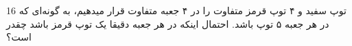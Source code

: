 16 توپ سفید و ۴ توپ قرمز متفاوت را در ۴ جعبه متفاوت قرار میدهیم، به گونه‌ای که در هر جعبه ۵ توپ باشد.
احتمال اینکه در هر جعبه دقیقا یک توپ قرمز باشد چقدر است؟
